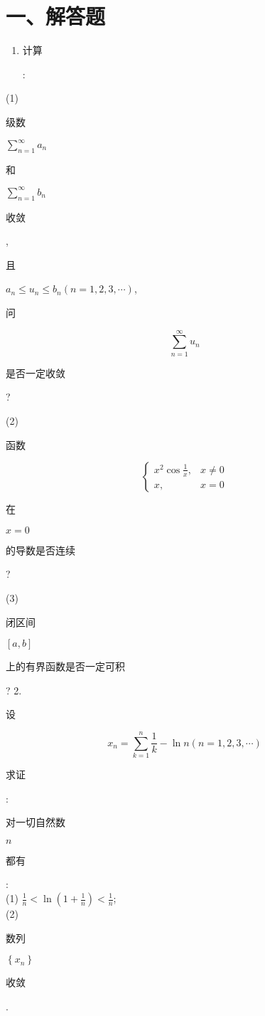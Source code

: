 \documentclass[10pt]{article}
\begin{document}
\section{一、解答题}
\begin{enumerate}
  \item \begin{CJK}{UTF8}{mj}计算\end{CJK}:
\end{enumerate}
(1) \begin{CJK}{UTF8}{mj}级数\end{CJK} $\sum_{n=1}^{\infty} a_{n}$ \begin{CJK}{UTF8}{mj}和\end{CJK} $\sum_{n=1}^{\infty} b_{n}$ \begin{CJK}{UTF8}{mj}收敛\end{CJK}, \begin{CJK}{UTF8}{mj}且\end{CJK} $a_{n} \leqslant u_{n} \leqslant b_{n}(n=1,2,3, \cdots)$, \begin{CJK}{UTF8}{mj}问\end{CJK}
$$
\sum_{n=1}^{\infty} u_{n}
$$
\begin{CJK}{UTF8}{mj}是否一定收敛\end{CJK}?

(2) \begin{CJK}{UTF8}{mj}函数\end{CJK}
$$
\begin{cases}x^{2} \cos \frac{1}{x}, & x \neq 0 \\ x, & x=0\end{cases}
$$
\begin{CJK}{UTF8}{mj}在\end{CJK} $x=0$ \begin{CJK}{UTF8}{mj}的导数是否连续\end{CJK}?

(3) \begin{CJK}{UTF8}{mj}闭区间\end{CJK} $[a, b]$ \begin{CJK}{UTF8}{mj}上的有界函数是否一定可积\end{CJK}? 2. \begin{CJK}{UTF8}{mj}设\end{CJK}
$$
x_{n}=\sum_{k=1}^{n} \frac{1}{k}-\ln n(n=1,2,3, \cdots)
$$
\begin{CJK}{UTF8}{mj}求证\end{CJK}: \begin{CJK}{UTF8}{mj}对一切自然数\end{CJK} $n$ \begin{CJK}{UTF8}{mj}都有\end{CJK}:\\
(1) $\frac{1}{n}<\ln \left(1+\frac{1}{n}\right)<\frac{1}{n}$;\\
(2) \begin{CJK}{UTF8}{mj}数列\end{CJK} $\left\{x_{n}\right\}$ \begin{CJK}{UTF8}{mj}收敛\end{CJK}.
\end{document}
